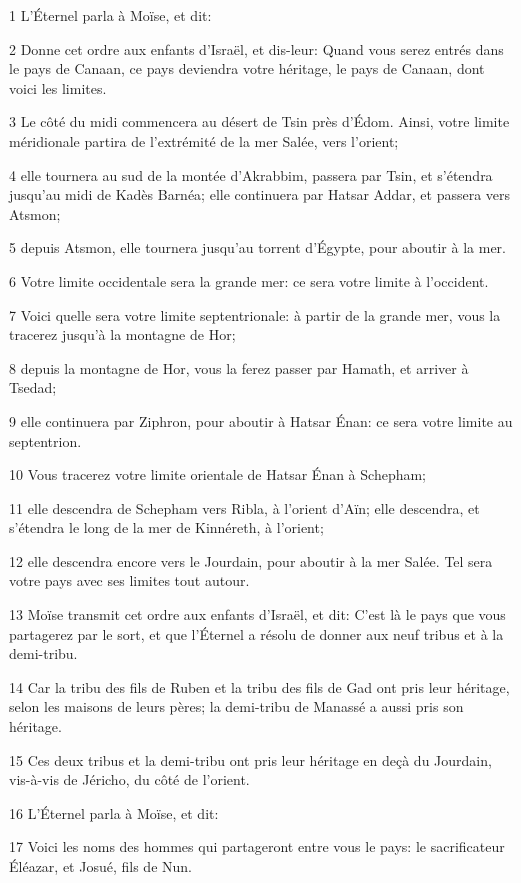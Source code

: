 \par 1 L'Éternel parla à Moïse, et dit:
\par 2 Donne cet ordre aux enfants d'Israël, et dis-leur: Quand vous serez entrés dans le pays de Canaan, ce pays deviendra votre héritage, le pays de Canaan, dont voici les limites.
\par 3 Le côté du midi commencera au désert de Tsin près d'Édom. Ainsi, votre limite méridionale partira de l'extrémité de la mer Salée, vers l'orient;
\par 4 elle tournera au sud de la montée d'Akrabbim, passera par Tsin, et s'étendra jusqu'au midi de Kadès Barnéa; elle continuera par Hatsar Addar, et passera vers Atsmon;
\par 5 depuis Atsmon, elle tournera jusqu'au torrent d'Égypte, pour aboutir à la mer.
\par 6 Votre limite occidentale sera la grande mer: ce sera votre limite à l'occident.
\par 7 Voici quelle sera votre limite septentrionale: à partir de la grande mer, vous la tracerez jusqu'à la montagne de Hor;
\par 8 depuis la montagne de Hor, vous la ferez passer par Hamath, et arriver à Tsedad;
\par 9 elle continuera par Ziphron, pour aboutir à Hatsar Énan: ce sera votre limite au septentrion.
\par 10 Vous tracerez votre limite orientale de Hatsar Énan à Schepham;
\par 11 elle descendra de Schepham vers Ribla, à l'orient d'Aïn; elle descendra, et s'étendra le long de la mer de Kinnéreth, à l'orient;
\par 12 elle descendra encore vers le Jourdain, pour aboutir à la mer Salée. Tel sera votre pays avec ses limites tout autour.
\par 13 Moïse transmit cet ordre aux enfants d'Israël, et dit: C'est là le pays que vous partagerez par le sort, et que l'Éternel a résolu de donner aux neuf tribus et à la demi-tribu.
\par 14 Car la tribu des fils de Ruben et la tribu des fils de Gad ont pris leur héritage, selon les maisons de leurs pères; la demi-tribu de Manassé a aussi pris son héritage.
\par 15 Ces deux tribus et la demi-tribu ont pris leur héritage en deçà du Jourdain, vis-à-vis de Jéricho, du côté de l'orient.
\par 16 L'Éternel parla à Moïse, et dit:
\par 17 Voici les noms des hommes qui partageront entre vous le pays: le sacrificateur Éléazar, et Josué, fils de Nun.
